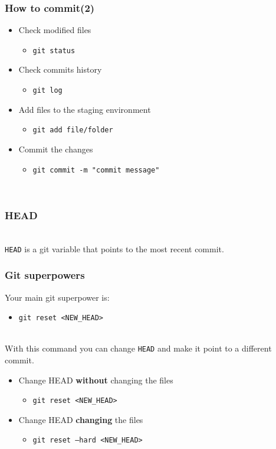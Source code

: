\documentclass{beamer}
\begin{document}
\begin{frame}
    \frametitle{How to commit(2)}
    \begin{itemize}
        \item Check modified files 
        \begin{itemize}
            \item \texttt{git status}
        \end{itemize}
        \item Check commits history
        \begin{itemize}
            \item \texttt{git log}
        \end{itemize}
        \item Add files to the staging environment
        \begin{itemize}
            \item \texttt{git add file/folder}
        \end{itemize}
        \item Commit the changes
        \begin{itemize}
            \item \texttt{git commit -m "commit message"}
        \end{itemize}
    \end{itemize}
    \hfill \\
    
\end{frame}


\begin{frame}
    \frametitle{HEAD}
    
    \hfill \\
    \texttt{HEAD} is a git variable that points to the most recent commit.
\end{frame}

\begin{frame}
    \frametitle{Git superpowers}
    Your main git superpower is:
    \begin{itemize}
        \item \texttt{git reset <NEW\_HEAD>}
    \end{itemize}
    \hfill \\
    With this command you can change \texttt{HEAD} and make it point to a different commit.
    \begin{itemize}
        \item Change HEAD \textbf{without} changing the files
        \begin{itemize}
            \item \texttt{git reset <NEW\_HEAD>}
        \end{itemize}
        \item Change HEAD \textbf{changing} the files
        \begin{itemize}
            \item \texttt{git reset --hard <NEW\_HEAD>}
        \end{itemize}
    \end{itemize}
\end{frame}
\end{document}
